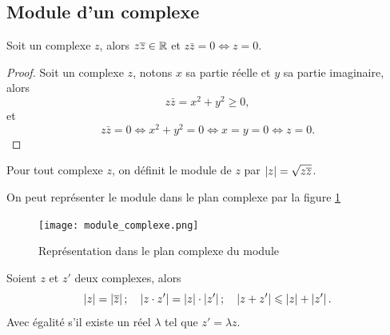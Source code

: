 \subsection{Module d'un complexe}
\label{subsec:modulecomplexe}
\begin{prop}
  Soit un complexe \(z\), alors \(z \overline{z} \in \mathbb{R}\) et \(z \bar{z}=0 \iff z = 0\).
\end{prop}
\begin{proof}
  Soit un complexe \(z\), notons \(x\) sa partie réelle et \(y\) sa partie imaginaire, alors
  \begin{equation}
    z \bar{z}=x^2+y^2 \geqslant 0,
  \end{equation}
  et
  \begin{equation}
    z \bar{z}=0 \iff x^2+y^2=0 \iff x=y=0 \iff z=0.
  \end{equation}
\end{proof}
%
\begin{defdef}
  Pour tout complexe \(z\), on définit le module de \(z\) par \(\left\lvert z\right\rvert=\sqrt{z \overline{z}}\).
\end{defdef}
%
On peut représenter le module dans le plan complexe par la figure \ref{fig:moduleComplexe}
\begin{figure}
    \centering
    \texttt{[image: module\_complexe.png]}
    \caption{Représentation dans le plan complexe du module}
    \label{fig:moduleComplexe}
\end{figure}
%
\begin{prop}
  Soient \(z\) et \(z'\) deux complexes, alors
  \begin{equation}
      \left\lvert z\right\rvert=\left\lvert\overline{z}\right\rvert; \quad \left\lvert z \cdot z'\right\rvert=\left\lvert z\right\rvert \cdot \left\lvert z'\right\rvert; \quad \left\lvert z+z'\right\rvert\leqslant\left\lvert z\right\rvert+\left\lvert z'\right\rvert.
  \end{equation}
  Avec égalité s'il existe un réel \(\lambda\) tel que \(z'=\lambda z\).
\end{prop}
